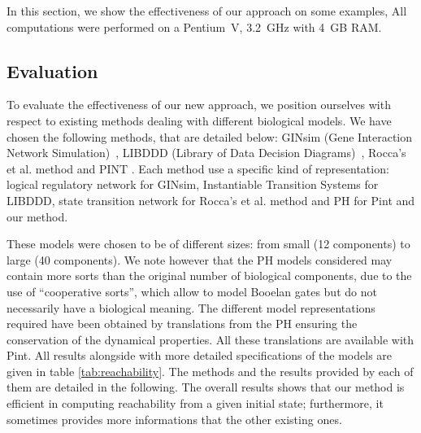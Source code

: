 In this section, we show the effectiveness of our approach on some examples,
%
All computations were performed on a Pentium~V, 3.2~GHz with 4~GB RAM.

\subsection{Evaluation}
To evaluate the effectiveness of our new approach,
we position ourselves with respect to existing methods dealing with different biological models.
We have chosen the following methods, that are detailed below:
GINsim (Gene Interaction Network Simulation)~\cite{gonzalez2006ginsim,naldi2009logical,naldi2007decision},
LIBDDD (Library of Data Decision Diagrams)~\cite{thierry2009hierarchical,colange2013towards},
Rocca's et al. method \cite{roccaasp}
and PINT \cite{PMR12-MSCS}.
Each method use a specific kind of representation:
logical regulatory network for GINsim,
Instantiable Transition Systems for LIBDDD,
state transition network for Rocca's et al. method
and PH for Pint and our method.

%
These models were chosen to be of different sizes:
from small (12 components) to large (40 components).
We note however that the PH models considered may contain more sorts than
the original number of biological components, due to the use of
“cooperative sorts”, which allow to model Booelan gates but do not necessarily
have a biological meaning.
The different model representations required have been obtained by translations
from the PH
ensuring the conservation of the dynamical properties.
All these translations are available with Pint.
All results alongside with more detailed specifications of the models
are given in table \ref{tab:reachability}.
The methods and the results provided by each of them are detailed in the following.
The overall results shows that our method is efficient in computing reachability
from a given initial state;
furthermore, it sometimes provides more informations that the other existing ones.


